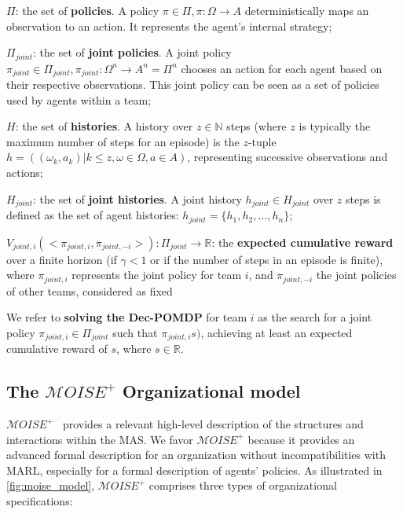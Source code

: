 \documentclass[sigconf,anonymous]{aamas}
\begin{document}
\begin{itemize*}[label={},itemjoin={; \quad}]
    \item $\Pi$: the set of \textbf{policies}. A policy $\pi \in \Pi, \pi: \Omega \rightarrow A$ deterministically maps an observation to an action. It represents the agent's internal strategy;
    \item $\Pi_{joint}$: the set of \textbf{joint policies}. A joint policy $\pi_{joint} \in \Pi_{joint}, \pi_{joint}: \Omega^n \rightarrow A^n = \Pi^n$ chooses an action for each agent based on their respective observations. This joint policy can be seen as a set of policies used by agents within a team;
    \item $H$: the set of \textbf{histories}. A history over $z \in \mathbb{N}$ steps (where $z$ is typically the maximum number of steps for an episode) is the $z$-tuple $h = ((\omega_{k}, a_{k}) | k \leq z, \omega \in \Omega, a \in A)$, representing successive observations and actions;
    \item $H_{joint}$: the set of \textbf{joint histories}. A joint history $h_{joint} \in H_{joint}$ over $z$ steps is defined as the set of agent histories: $h_{joint} = \{h_1, h_2, ..., h_n\}$;
    \item $V_{joint,i}(<\pi_{joint,i}, \pi_{joint,-i}>): \Pi_{joint} \rightarrow \mathbb{R}$: the \textbf{expected cumulative reward} over a finite horizon (if $\gamma < 1$ or if the number of steps in an episode is finite), where $\pi_{joint,i}$ represents the joint policy for team $i$, and $\pi_{joint,-i}$ the joint policies of other teams, considered as fixed
\end{itemize*}

We refer to \textbf{solving the Dec-POMDP} for team $i$ as the search for a joint policy $\pi_{joint,i} \in \Pi_{joint}$ such that $\pi_{joint,i}s)$, achieving at least an expected cumulative reward of $s$, where $s \in \mathbb{R}$.



\subsection{The $\mathcal{M}OISE^+$ Organizational model}

$\mathcal{M}OISE^+$~\citep{Hubner2007} provides a relevant high-level description of the structures and interactions within the MAS. We favor $\mathcal{M}OISE^+$ because it provides an advanced formal description for an organization without incompatibilities with MARL, especially for a formal description of agents' policies.
As illustrated in \ref{fig:moise_model}, $\mathcal{M}OISE^+$ comprises three types of organizational specifications:
\end{document}
